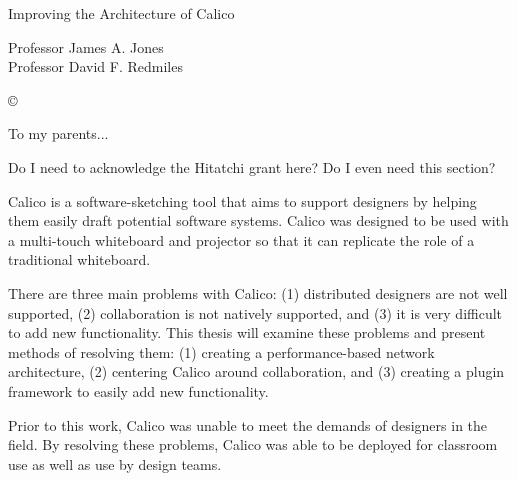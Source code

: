 \documentclass[12pt,fleqn]{ucithesis}
\begin{document}
\thesistitle
{
  Improving the Architecture of Calico
}




\othercommitteemembers
{
  Professor James A. Jones\\
  Professor David F. Redmiles
}


\copyrightdeclaration
{
  {\copyright} {\Degreeyear} \Authorname
}


\dedications
{
  To my parents...
}

\acknowledgments
{
  Do I need to acknowledge the Hitatchi grant here? Do I even need this section?
}

\thesisabstract
{
  Calico is a software-sketching tool that aims to support designers by helping them easily draft potential software systems. 
  Calico was designed to be used with a multi-touch whiteboard and projector so that it can replicate the role of a traditional whiteboard. 

  There are three main problems with Calico: 
  (1) distributed designers are not well supported, 
  (2) collaboration is not natively supported,
  and (3) it is very difficult to add new functionality.
  This thesis will examine these problems and present methods of resolving them:
  (1) creating a performance-based network architecture,
  (2) centering Calico around collaboration,
  and (3) creating a plugin framework to easily add new functionality.

  Prior to this work, Calico was unable to meet the demands of designers in the field. By resolving these problems, Calico was able to be deployed for classroom use as well as use by design teams.
}
\end{document}
